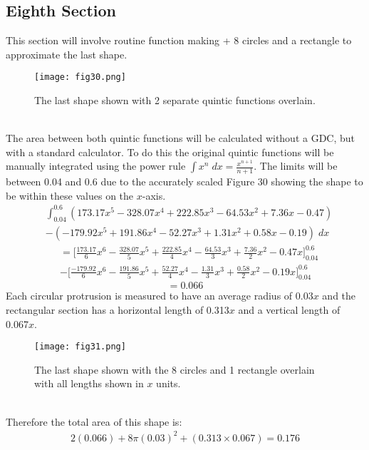 \documentclass[a4paper,12pt]{article}
\begin{document}
\subsection{Eighth Section}
This section will involve routine function making + 8 circles and a rectangle to approximate the last shape. 
\begin{figure}[h!]
\centering
\texttt{[image: fig30.png]}
\caption{The last shape shown with 2 separate quintic functions overlain.}
\label{fig:clock30}
\end{figure}
\\The area between both quintic functions will be calculated without a GDC, but with a standard calculator. To do this the original quintic functions will be manually integrated using the power rule $\int{x^n}\;dx=\frac{x^{n+1}}{n+1}$. The limits will be between 0.04 and 0.6 due to the accurately scaled Figure 30 showing the shape to be within these values on the $x$-axis.
\begin{equation}
\begin{aligned} 
&\int_{0.04}^{0.6}{(173.17x^5-328.07x^4+222.85x^3-64.53x^2+7.36x-0.47)}\\&-(-179.92x^5+191.86x^4-52.27x^3+1.31x^2+0.58x-0.19)\;dx
\end{aligned}
\end{equation}
\begin{equation}
\begin{aligned} 
&=\bigl[\tfrac{173.17}{6}x^6-\tfrac{328.07}{5}x^5+\tfrac{222.85}{4}x^4-\tfrac{64.53}{3}x^3+\tfrac{7.36}{2}x^2-0.47x\bigr]_{0.04}^{0.6} \\&- \bigl[\tfrac{-179.92}{6}x^6-\tfrac{191.86}{5}x^5+\tfrac{52.27}{4}x^4-\tfrac{1.31}{3}x^3+\tfrac{0.58}{2}x^2-0.19x\bigr]_{0.04}^{0.6}
\end{aligned}
\end{equation}
$$=0.066$$
Each circular protrusion is measured to have an average radius of 0.03$x$ and the rectangular section has a horizontal length of 0.313$x$ and a vertical length of 0.067$x$.
\begin{figure}[h!]
\centering
\texttt{[image: fig31.png]}
\caption{The last shape shown with the 8 circles and 1 rectangle overlain with all lengths shown in $x$ units.}
\label{fig:clock31}
\end{figure}
\\Therefore the total area of this shape is:
\begin{equation}
\begin{aligned} 
2(0.066)+8\pi(0.03)^2+(0.313\times0.067)=0.176
\end{aligned}
\end{equation}
\end{document}
